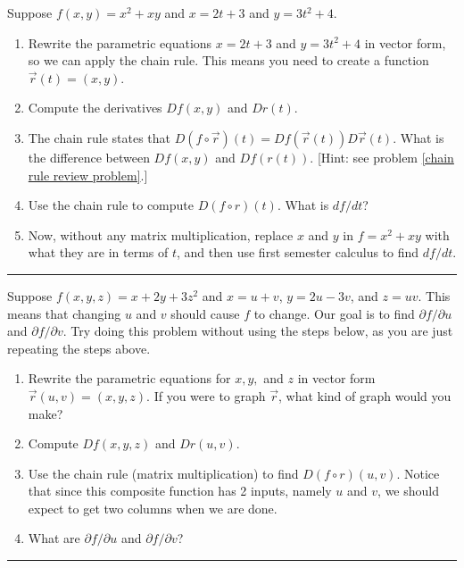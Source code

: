 \begin{problem}%
 Suppose $f(x,y) = x^2+xy$ and $x=2t+3$ and $y=3t^2+4$.
 \begin{enumerate}
  \item Rewrite the parametric equations $x=2t+3$ and $y=3t^2+4$ in vector form, so we can apply the chain rule. This means you need to create a function $\vec r(t) = (x,y)$.
  \item Compute the derivatives $Df(x,y)$ and $Dr(t)$. 
  \item The chain rule states that $D(f\circ \vec r)(t) = Df(\vec r(t))D\vec r(t)$. What is the difference between $Df(x,y)$ and $Df(r(t))$. [Hint: see problem \ref{chain rule review problem}.]
  \item Use the chain rule to compute $D(f\circ r)(t)$. What is $df/dt$?
  \item Now, without any matrix multiplication, replace $x$ and $y$ in $f=x^2+xy$ with what they are in terms of $t$, and then use first semester calculus to find $df/dt$.
 \end{enumerate}
\hrule\end{problem}

\begin{problem}%
 Suppose $f(x,y,z) = x+2y+3z^2$ and $x=u+v$, $y=2u-3v$, and $z=uv$.  This means that changing $u$ and $v$ should cause $f$ to change. Our goal is to find $\partial f/\partial u$ and $\partial f/\partial v$. Try doing this problem without using the steps below, as you are just repeating the steps above.
 \begin{enumerate}
  \item Rewrite the parametric equations for $x,y,$ and $z$ in vector form $\vec r(u,v)=(x,y,z)$. If you were to graph $\vec r$, what kind of graph would you make?
  \item Compute $Df(x,y,z)$ and $Dr(u,v)$.  
  \item Use the chain rule (matrix multiplication) to find $D(f\circ r)(u,v)$.  Notice that since this composite function has 2 inputs, namely $u$ and $v$, we should expect to get two columns when we are done.
  \item What are $\partial f/\partial u$ and $\partial f/\partial v$? 
 \end{enumerate}
\hrule\end{problem}

